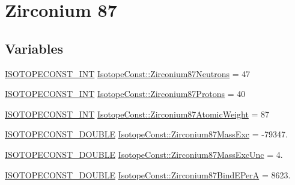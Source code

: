\hypertarget{group___isotope_const-_zirconium-_zr87}{}\section{Zirconium 87}
\label{group___isotope_const-_zirconium-_zr87}
\subsection*{Variables}
\begin{DoxyCompactItemize}
\item 
\mbox{\hyperlink{group___isotope_const-_macros_ga5f18360b3e99483a35c32d789e62621c}{I\+S\+O\+T\+O\+P\+E\+C\+O\+N\+S\+T\+\_\+\+I\+NT}} \mbox{\hyperlink{group___isotope_const-_zirconium-_zr87_ga4caee31b85f46384a5a8b2161c95c06f}{Isotope\+Const\+::\+Zirconium87\+Neutrons}} = 47
\item 
\mbox{\hyperlink{group___isotope_const-_macros_ga5f18360b3e99483a35c32d789e62621c}{I\+S\+O\+T\+O\+P\+E\+C\+O\+N\+S\+T\+\_\+\+I\+NT}} \mbox{\hyperlink{group___isotope_const-_zirconium-_zr87_gaf93b181fcf78e28021175dbd8de49674}{Isotope\+Const\+::\+Zirconium87\+Protons}} = 40
\item 
\mbox{\hyperlink{group___isotope_const-_macros_ga5f18360b3e99483a35c32d789e62621c}{I\+S\+O\+T\+O\+P\+E\+C\+O\+N\+S\+T\+\_\+\+I\+NT}} \mbox{\hyperlink{group___isotope_const-_zirconium-_zr87_ga6dc3fdedac5e0e308f00f1f77ee427d1}{Isotope\+Const\+::\+Zirconium87\+Atomic\+Weight}} = 87
\item 
\mbox{\hyperlink{group___isotope_const-_macros_ga8f45a7272ce02c0b4c65c44636ed719a}{I\+S\+O\+T\+O\+P\+E\+C\+O\+N\+S\+T\+\_\+\+D\+O\+U\+B\+LE}} \mbox{\hyperlink{group___isotope_const-_zirconium-_zr87_ga423696211c7902e900f6728e8bc5fe50}{Isotope\+Const\+::\+Zirconium87\+Mass\+Exc}} = -\/79347.
\item 
\mbox{\hyperlink{group___isotope_const-_macros_ga8f45a7272ce02c0b4c65c44636ed719a}{I\+S\+O\+T\+O\+P\+E\+C\+O\+N\+S\+T\+\_\+\+D\+O\+U\+B\+LE}} \mbox{\hyperlink{group___isotope_const-_zirconium-_zr87_ga5b6fcdf67c4705a774a2d2876e10b53d}{Isotope\+Const\+::\+Zirconium87\+Mass\+Exc\+Unc}} = 4.
\item 
\mbox{\hyperlink{group___isotope_const-_macros_ga8f45a7272ce02c0b4c65c44636ed719a}{I\+S\+O\+T\+O\+P\+E\+C\+O\+N\+S\+T\+\_\+\+D\+O\+U\+B\+LE}} \mbox{\hyperlink{group___isotope_const-_zirconium-_zr87_ga74a05a7d1f8e59e5a1466c7975eaebdb}{Isotope\+Const\+::\+Zirconium87\+Bind\+E\+PerA}} = 8623.
\item 

\end{DoxyCompactItemize}

